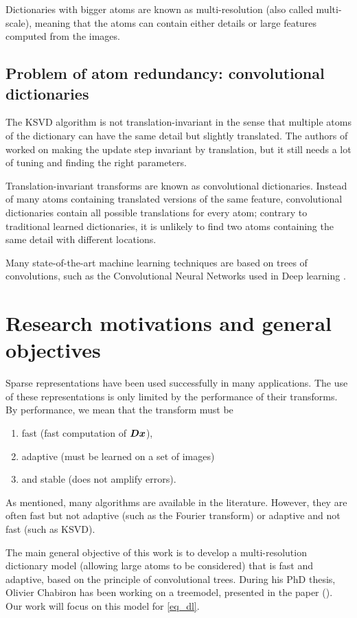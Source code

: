 \noindent
Dictionaries with bigger atoms are known as multi-resolution (also called multi-scale), meaning that the atoms can contain either details or large features computed from the images.


\subsection{Problem of atom redundancy: convolutional dictionaries}\label{sec_atoms_redund}
The \ac{KSVD} algorithm is not translation-invariant in the sense that multiple atoms of the dictionary can have the same detail but slightly translated. The authors of \cite{mailhe_shift-invariant_2008} worked on making the update step invariant by translation, but it still needs a lot of tuning and finding the right parameters.

\noindent
Translation-invariant transforms are known as convolutional dictionaries. Instead of many atoms containing translated versions of the same feature, convolutional dictionaries contain all possible translations for every atom; contrary to traditional learned dictionaries, it is unlikely to find two atoms containing the same detail with different locations.

\noindent
Many state-of-the-art machine learning techniques are based on trees of convolutions, such as the Convolutional Neural Networks used in Deep learning \cite{lecun_deep_2015}.

\section{Research motivations and general objectives}
Sparse representations have been used successfully in many applications. The use of these representations is only limited by the performance of their transforms. By performance, we mean that the transform must be
\begin{enumerate}[label=--,noitemsep,nolistsep]
\item fast (fast computation of $\bm{D}\bm{x}$),
\item adaptive (must be learned on a set of images)
\item and stable (does not amplify errors).
\end{enumerate}

\noindent
As mentioned, many algorithms are available in the literature. However, they are often fast but not adaptive (such as the Fourier transform) or adaptive and not fast (such as \ac{KSVD}).

\noindent
The main general objective of this work is to develop a multi-resolution dictionary model (allowing large atoms to be considered) that is fast and adaptive, based on the principle of convolutional trees. During his PhD thesis, Olivier Chabiron has been working on a \gls{treemodel}, presented in the paper  (\cite{chabiron_optimization_2016}). Our work will focus on this model for \eqref{eq_dl}.


